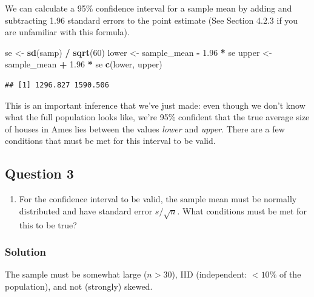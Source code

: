 \documentclass[]{article}
\newenvironment{Shaded}{\begin{snugshade}}{\end{snugshade}}
\newcommand{\KeywordTok}[1]{\textcolor[rgb]{0.13,0.29,0.53}{\textbf{#1}}}
\newcommand{\DecValTok}[1]{\textcolor[rgb]{0.00,0.00,0.81}{#1}}
\newcommand{\FloatTok}[1]{\textcolor[rgb]{0.00,0.00,0.81}{#1}}
\newcommand{\StringTok}[1]{\textcolor[rgb]{0.31,0.60,0.02}{#1}}
\newcommand{\OperatorTok}[1]{\textcolor[rgb]{0.81,0.36,0.00}{\textbf{#1}}}
\newcommand{\NormalTok}[1]{#1}
\providecommand{\tightlist}{%
  \setlength{\itemsep}{0pt}\setlength{\parskip}{0pt}}
\begin{document}
We can calculate a 95\% confidence interval for a sample mean by adding
and subtracting 1.96 standard errors to the point estimate (See Section
4.2.3 if you are unfamiliar with this formula).

\begin{Shaded}
\begin{Highlighting}[]
\NormalTok{se <-}\StringTok{ }\KeywordTok{sd}\NormalTok{(samp) }\OperatorTok{/}\StringTok{ }\KeywordTok{sqrt}\NormalTok{(}\DecValTok{60}\NormalTok{)}
\NormalTok{lower <-}\StringTok{ }\NormalTok{sample_mean }\OperatorTok{-}\StringTok{ }\FloatTok{1.96} \OperatorTok{*}\StringTok{ }\NormalTok{se}
\NormalTok{upper <-}\StringTok{ }\NormalTok{sample_mean }\OperatorTok{+}\StringTok{ }\FloatTok{1.96} \OperatorTok{*}\StringTok{ }\NormalTok{se}
\KeywordTok{c}\NormalTok{(lower, upper)}
\end{Highlighting}
\end{Shaded}

\begin{verbatim}
## [1] 1296.827 1590.506
\end{verbatim}

This is an important inference that we've just made: even though we
don't know what the full population looks like, we're 95\% confident
that the true average size of houses in Ames lies between the values
\emph{lower} and \emph{upper}. There are a few conditions that must be
met for this interval to be valid.

\subsection{Question 3}\label{question-3}

\begin{enumerate}
\def\labelenumi{\arabic{enumi}.}
\setcounter{enumi}{2}
\tightlist
\item
  For the confidence interval to be valid, the sample mean must be
  normally distributed and have standard error \(s / \sqrt{n}\). What
  conditions must be met for this to be true?
\end{enumerate}

\subsubsection{Solution}\label{solution-2}

The sample must be somewhat large (\(n > 30\)), IID (independent:
\(< 10\%\) of the population), and not (strongly) skewed.
\end{document}
